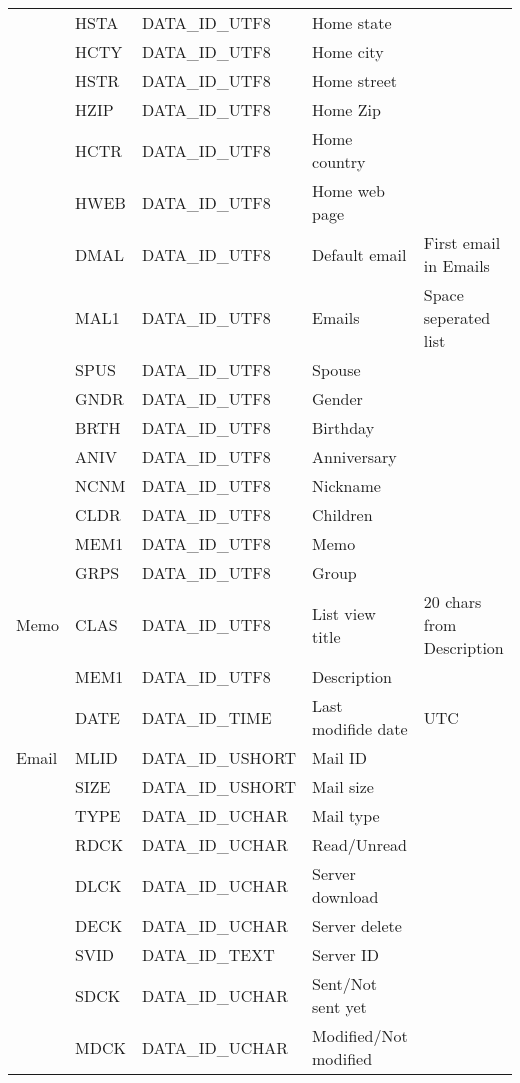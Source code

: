 \begin{longtable}[c]{|l|l|l|p{3cm}|p{5cm}|}
        & HSTA & DATA\_ID\_UTF8 & Home state & \\
        & HCTY & DATA\_ID\_UTF8 & Home city & \\
        & HSTR & DATA\_ID\_UTF8 & Home street & \\
        & HZIP & DATA\_ID\_UTF8 & Home Zip & \\
        & HCTR & DATA\_ID\_UTF8 & Home country & \\
        & HWEB & DATA\_ID\_UTF8 & Home web page & \\
        & DMAL & DATA\_ID\_UTF8 & Default email & First email in Emails \\
        & MAL1 & DATA\_ID\_UTF8 & Emails & Space seperated list \\
        & SPUS & DATA\_ID\_UTF8 & Spouse & \\
        & GNDR & DATA\_ID\_UTF8 & Gender & \\
        & BRTH & DATA\_ID\_UTF8 & Birthday & \\
        & ANIV & DATA\_ID\_UTF8 & Anniversary & \\
        & NCNM & DATA\_ID\_UTF8 & Nickname & \\
        & CLDR & DATA\_ID\_UTF8 & Children & \\
        & MEM1 & DATA\_ID\_UTF8 & Memo & \\
        & GRPS & DATA\_ID\_UTF8 & Group & \\
        \hline
        Memo & CLAS & DATA\_ID\_UTF8 & List view title & 20 chars from
        Description \\
        & MEM1 & DATA\_ID\_UTF8 & Description & \\
        & DATE & DATA\_ID\_TIME & Last modifide date & UTC \\
        \hline
        Email & MLID & DATA\_ID\_USHORT & Mail ID & \\
        & SIZE & DATA\_ID\_USHORT & Mail size & \\
        & TYPE & DATA\_ID\_UCHAR & Mail type & \\
        & RDCK & DATA\_ID\_UCHAR & Read/Unread & \\
        & DLCK & DATA\_ID\_UCHAR & Server download & \\
        & DECK & DATA\_ID\_UCHAR & Server delete & \\
        & SVID & DATA\_ID\_TEXT & Server ID & \\
        & SDCK & DATA\_ID\_UCHAR & Sent/Not sent yet & \\
        & MDCK & DATA\_ID\_UCHAR & Modified/Not modified & \\

\end{longtable}

